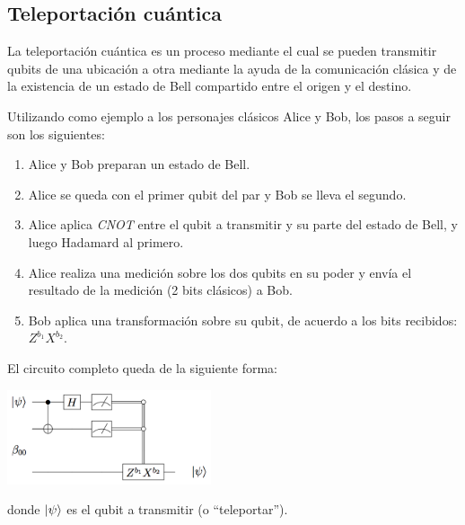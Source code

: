 \subsection{Teleportación cuántica}\label{teleportation}

La teleportación cuántica es un proceso mediante el cual se pueden transmitir qubits de una ubicación a otra mediante la ayuda de la comunicación clásica y de la existencia de un estado de Bell compartido entre el origen y el destino.

Utilizando como ejemplo a los personajes clásicos Alice y Bob, los pasos a seguir son los siguientes:
\begin{enumerate}
  \item Alice y Bob preparan un estado de Bell.
  \item Alice se queda con el primer qubit del par y Bob se lleva el segundo.
  \item Alice aplica \textit{CNOT} entre el qubit a transmitir y su parte del estado de Bell, y luego Hadamard al primero.
  \item Alice realiza una medición sobre los dos qubits en su poder y envía el resultado de la medición (2 bits clásicos) a Bob.
  \item Bob aplica una transformación sobre su qubit, de acuerdo a los bits recibidos: \( Z^{b_1} X^{b_2} \).
\end{enumerate}

El circuito completo queda de la siguiente forma:

\begin{center}
  \includegraphics[width=6cm]{Figures/teleportation}
\end{center}

donde \( \ket{\psi} \) es el qubit a transmitir (o ``teleportar'').

